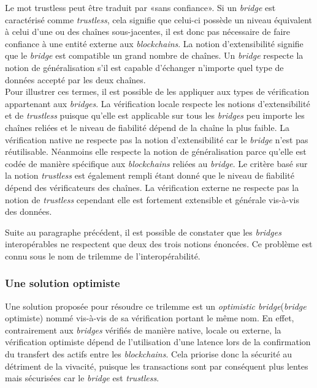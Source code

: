 Le mot trustless peut être traduit par «sans confiance». Si un \textit{bridge} est caractérisé comme \textit{trustless}, cela signifie que celui-ci possède un niveau équivalent à celui d’une ou des chaînes sous-jacentes, il est donc pas nécessaire de faire confiance à une entité externe aux \textit{blockchains}.  La notion  d’extensibilité signifie que le \textit{bridge} est compatible un grand nombre de chaînes.
Un \textit{bridge} respecte la notion de généralisation s’il est capable d'échanger n’importe quel type de données accepté par les deux chaînes.\\

Pour illustrer ces termes, il est possible de les appliquer aux types de vérification appartenant aux \textit{bridges}. La vérification locale respecte les notions d’extensibilité et de \textit{trustless} puisque qu'elle est applicable sur tous les \textit{bridges} peu importe les chaînes reliées et le niveau de fiabilité dépend de la chaîne la plus faible.
La vérification native ne respecte pas la notion d’extensibilité car le \textit{bridge} n’est pas réutilisable. Néanmoins elle respecte la notion de généralisation parce qu’elle est codée de manière spécifique aux \textit{\gls{blockchain}s} reliées au \textit{bridge}. Le critère basé sur la notion \textit{trustless} est également rempli étant donné que le niveau de fiabilité dépend des vérificateurs des chaînes.
La vérification externe ne respecte pas la notion de \textit{trustless} cependant elle est fortement extensible et générale vis-à-vis des données. \cite{Ngrave}

 Suite au paragraphe précédent, il est possible de constater que les \textit{bridges} interopérables ne respectent que deux des trois notions énoncées. Ce problème est connu sous le nom de trilemme de l’interopérabilité. 

\subsubsection{Une solution optimiste}

Une solution proposée pour résoudre ce trilemme est un \textit{optimistic bridge}(\textit{bridge} optimiste) nommé vis-à-vis de sa vérification portant le même nom\cite{OptimisticBhuptani}. En effet, contrairement aux \textit{bridges} vérifiés de manière native, locale ou externe, la vérification optimiste dépend de l’utilisation d’une latence lors de la confirmation du transfert des \gls{actif}s entre les \textit{\gls{blockchain}s}. Cela priorise donc la sécurité au détriment de la vivacité, puisque les transactions sont par conséquent plus lentes mais sécurisées car le \textit{bridge} est \textit{trustless}. \\

